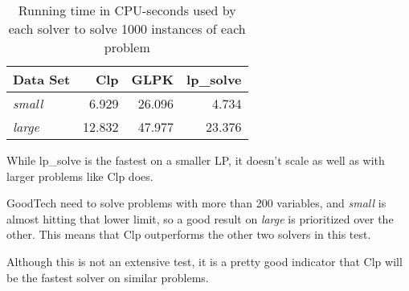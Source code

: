 \begin{table}[h!]
    \centering
    \caption{Running time in CPU-seconds used by each solver to solve 1000
             instances of each problem}
    \begin{tabular}{lrrr}
        Data Set       & Clp    & GLPK   & lp\_solve \\ \hline
        \textit{small} & 6.929  & 26.096 & 4.734 \\
        \textit{large} & 12.832 & 47.977 & 23.376
    \end{tabular}
    \label{table:lpres}
\end{table}

While lp\_solve is the fastest on a smaller LP, it doesn't scale as well as
with larger problems like Clp does.

GoodTech need to solve problems with more than 200 variables, and
\textit{small} is almost hitting that lower limit, so a good result on
\textit{large} is prioritized over the other.
This means that Clp outperforms the other two solvers in this test.

Although this is not an extensive test, it is a pretty good indicator that Clp
will be the fastest solver on similar problems.
